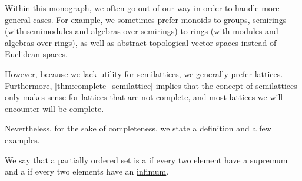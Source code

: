 \begin{remark}\label{rem:semilattices}
  Within this monograph, we often go out of our way in order to handle more general cases. For example, we sometimes prefer \hyperref[def:monoid]{monoids} to \hyperref[def:group]{groups}, \hyperref[def:semiring]{semirings} (with \hyperref[def:semimodule]{semimodules} and \hyperref[def:algebra_over_semiring]{algebras over semirings}) to \hyperref[def:ring]{rings} (with \hyperref[def:module]{modules} and \hyperref[def:algebra_over_ring]{algebras over rings}), as well as abstract \hyperref[def:topological_vector_space]{topological vector spaces} instead of \hyperref[def:euclidean_space]{Euclidean spaces}.

  However, because we lack utility for \hyperref[def:semilattice]{semilattices}, we generally prefer \hyperref[def:lattice]{lattices}. Furthermore, \cref{thm:complete_semilattice} implies that the concept of semilattices only makes sense for lattices that are not \hyperref[def:complete_lattice]{complete}, and most lattices we will encounter will be complete.

  Nevertheless, for the sake of completeness, we state a definition and a few examples.
\end{remark}

\begin{definition}\label{def:semilattice}
  We say that a \hyperref[def:partially_ordered_set]{partially ordered set} is a  if every two element have a \hyperref[def:extremal_points/supremum_and_infimum]{supremum} and a  if every two elements have an \hyperref[def:extremal_points/supremum_and_infimum]{infimum}.
\end{definition}


